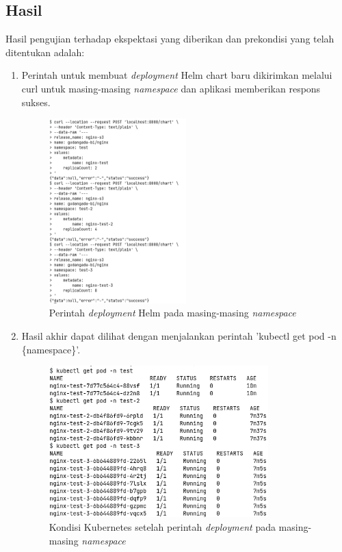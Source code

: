 \subsection{Hasil}
Hasil pengujian terhadap ekspektasi yang diberikan dan prekondisi yang telah ditentukan adalah:
\begin{enumerate}
    \item Perintah untuk membuat \textit{deployment} Helm chart baru dikirimkan melalui curl untuk masing-masing \textit{namespace} dan aplikasi memberikan respons sukses.
    \begin{figure}
    	\centering
    	\includegraphics[width=0.5\textwidth]{pics/5.2.curl.png}
    	\caption{Perintah \textit{deployment} Helm pada masing-masing \textit{namespace}}
    	\label{fig:curlNamespace}
    \end{figure}
    \item Hasil akhir dapat dilihat dengan menjalankan perintah 'kubectl get pod -n \{namespace\}'.
    \begin{figure}
    	\centering
    	\includegraphics[width=0.8\textwidth]{pics/5.2.get-pod.png}
    	\caption{Kondisi Kubernetes setelah perintah \textit{deployment} pada masing-masing \textit{namespace}}
    	\label{fig:getPodFinalNamespace}
    \end{figure}
    
\end{enumerate}


